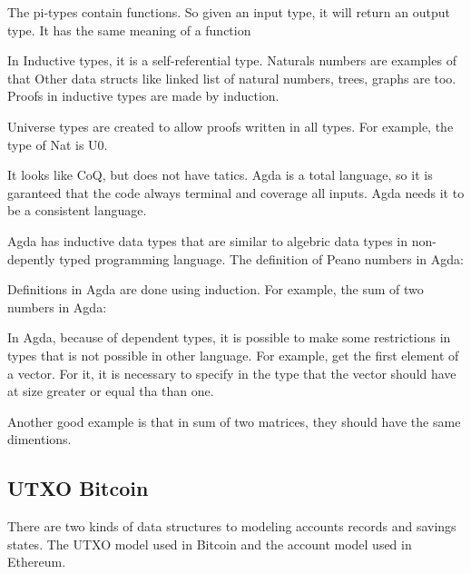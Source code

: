 \documentclass[12pt]{article}
\begin{document}
    The pi-types contain functions.
    So given an input type, it will return an output type.
    It has the same meaning of a function

    In Inductive types, it is a self-referential type.
    Naturals numbers are examples of that
    Other data structs like linked list of natural numbers, trees, graphs are too.
    Proofs in inductive types are made by induction.

    Universe types are created to allow proofs written in all types.
    For example, the type of Nat is U0.


It looks like CoQ, but does not have tatics.
Agda is a total language, so it is garanteed that the code always terminal and coverage all inputs.
Agda needs it to be a consistent language.

Agda has inductive data types that are similar to algebric data types in non-depently typed programming language.
The definition of Peano numbers in Agda:


Definitions in Agda are done using induction.
For example, the sum of two numbers in Agda:


In Agda, because of dependent types, it is possible to make some restrictions in types that is not possible in other language.
For example, get the first element of a vector.
For it, it is necessary to specify in the type that the vector should have at size greater or equal tha than one.


Another good example is that in sum of two matrices, they should have the same dimentions.


\subsection{UTXO Bitcoin}

There are two kinds of data structures to modeling accounts records and savings states.
The UTXO model used in Bitcoin and the account model used in Ethereum.
\end{document}

